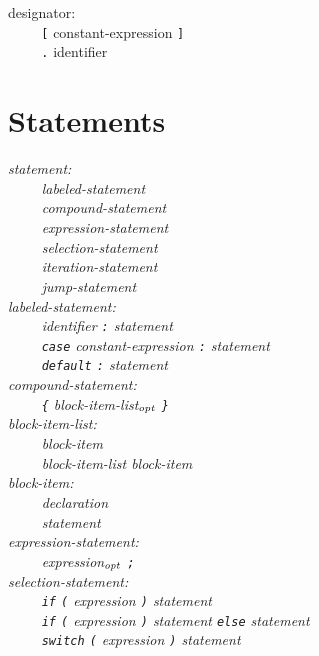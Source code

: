 \documentclass[12pt]{report}
\def\|{\verb|}
\newcommand\opt{$_{{\it opt}}$ }
\begin{document}
\noindent
designator:\\
\|    | \verb+[+ constant-expression \verb+]+\\
\|    | \verb+.+ identifier\\

\rm
\section{Statements}
\it
\noindent
statement:\\
\|    | labeled-statement\\
\|    | compound-statement\\
\|    | expression-statement\\
\|    | selection-statement\\
\|    | iteration-statement\\
\|    | jump-statement\\

\noindent
labeled-statement:\\
\|    | identifier \verb+:+ statement\\
\|    | \verb+case+ constant-expression \verb+:+ statement\\
\|    | \verb+default+ \verb+:+ statement\\

\noindent
compound-statement:\\
\|    | \verb+{+ block-item-list\opt \verb+}+\\

\noindent
block-item-list:\\
\|    | block-item\\
\|    | block-item-list block-item\\

\noindent
block-item:\\
\|    | declaration\\
\|    | statement\\

\noindent
expression-statement:\\
\|    | expression\opt \verb+;+\\

\noindent
selection-statement:\\
\|    | \verb+if+ \verb+(+ expression \verb+)+ statement\\
\|    | \verb+if+ \verb+(+ expression \verb+)+ statement \verb+else+ statement\\
\|    | \verb+switch+ \verb+(+ expression \verb+)+ statement\\
\end{document}
